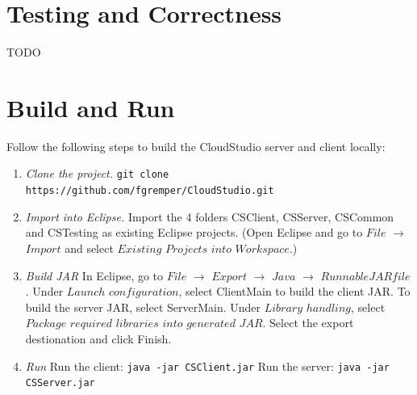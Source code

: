 \section{Testing and Correctness}

TODO


\section{Build and Run}

Follow the following steps to build the CloudStudio server and client locally:

\begin{enumerate}


\item \emph{Clone the project.} \newline
\texttt{git clone https://github.com/fgremper/CloudStudio.git}
\item \emph{Import into Eclipse.} \newline Import the 4 folders CSClient, CSServer, CSCommon and CSTesting as existing Eclipse projects. (Open Eclipse and go to $File$ $\rightarrow$ $Import$ and select $Existing$ $Projects$ $into$ $Workspace$.)
\item \emph{Build JAR} \newline
In Eclipse, go to $File$ $\rightarrow$ $Export$ $\rightarrow$ $Java$ $\rightarrow$ $Runnable JAR file$.
Under $Launch$ $configuration$, select ClientMain to build the client JAR. To build the server JAR, select ServerMain. Under $Library$ $handling$, select $Package$ $required$ $libraries$ $into$ $generated$ $JAR$.
Select the export destionation and click Finish.
\item \emph{Run} \newline
Run the client:
\texttt{java -jar CSClient.jar} \newline
Run the server:
\texttt{java -jar CSServer.jar}

\end{enumerate}
